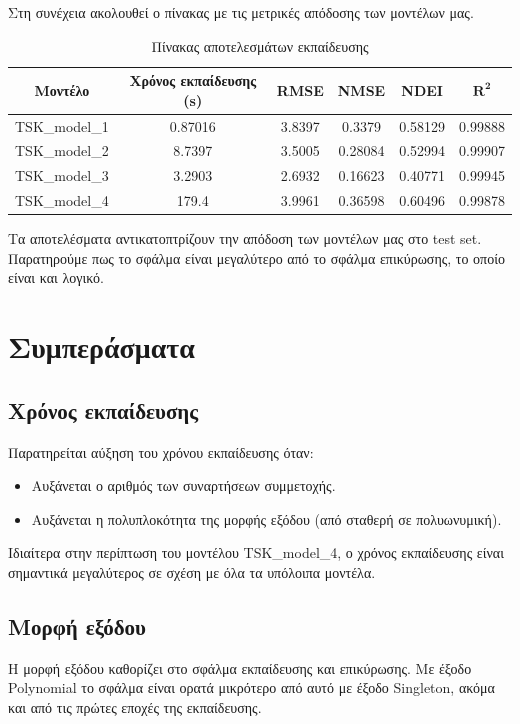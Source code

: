 \documentclass[12pt]{report}
\begin{document}
Στη συνέχεια ακολουθεί ο πίνακας με τις μετρικές απόδοσης των μοντέλων μας.
\begin{table}[H]
    \centering
    \begin{tabular}{|c|c|c|c|c|c|}
        \hline
        \textbf{Μοντέλο} & \textbf{Χρόνος εκπαίδευσης (s)} & \textbf{RMSE} & \textbf{NMSE} & \textbf{NDEI} & $\mathbf{R^2}$ \\
        \hline
        TSK\_model\_1 & 0.87016 & 3.8397 & 0.3379 & 0.58129 & 0.99888 \\
        TSK\_model\_2 & 8.7397 & 3.5005 & 0.28084 & 0.52994 & 0.99907 \\
        TSK\_model\_3 & 3.2903 & 2.6932 & 0.16623 & 0.40771 & 0.99945 \\
        TSK\_model\_4 & 179.4 & 3.9961 & 0.36598 & 0.60496 & 0.99878 \\
        \hline
    \end{tabular}
    \caption{Πίνακας αποτελεσμάτων εκπαίδευσης}
    \label{tab:results}
\end{table}
Τα αποτελέσματα αντικατοπτρίζουν την απόδοση των μοντέλων μας στο test set. Παρατηρούμε πως το σφάλμα είναι μεγαλύτερο από το σφάλμα επικύρωσης, το οποίο είναι και λογικό.

\section{Συμπεράσματα}
\subsection{Χρόνος εκπαίδευσης}
Παρατηρείται αύξηση του χρόνου εκπαίδευσης όταν:
\begin{itemize}
    \item Αυξάνεται ο αριθμός των συναρτήσεων συμμετοχής.
    \item Αυξάνεται η πολυπλοκότητα της μορφής εξόδου (από σταθερή σε πολυωνυμική).
\end{itemize}
Ιδιαίτερα στην περίπτωση του μοντέλου TSK\_model\_4, ο χρόνος εκπαίδευσης είναι σημαντικά μεγαλύτερος σε σχέση με όλα τα υπόλοιπα μοντέλα.

\subsection{Μορφή εξόδου}
Η μορφή εξόδου καθορίζει στο σφάλμα εκπαίδευσης και επικύρωσης. Με έξοδο Polynomial το σφάλμα είναι ορατά μικρότερο από αυτό με έξοδο Singleton, ακόμα και από τις πρώτες εποχές της εκπαίδευσης. 
\end{document}
